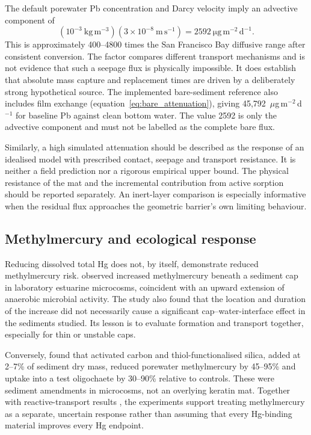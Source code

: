 The default porewater Pb concentration and Darcy velocity imply an advective component of
\begin{equation}
(10^{-3}\ \mathrm{kg\,m^{-3}})
(3\times10^{-8}\ \mathrm{m\,s^{-1}})
=2592\ \mathrm{\mu g\,m^{-2}\,d^{-1}}.
\end{equation}
This is approximately 400--4800 times the San Francisco Bay diffusive range after consistent conversion. The factor compares different transport mechanisms and is not evidence that such a seepage flux is physically impossible. It does establish that absolute mass capture and replacement times are driven by a deliberately strong hypothetical source. The implemented bare-sediment reference also includes film exchange (equation~\ref{eq:bare_attenuation}), giving 45,792~$\mu$g\,m$^{-2}$\,d$^{-1}$ for baseline Pb against clean bottom water. The value 2592 is only the advective component and must not be labelled as the complete bare flux.

Similarly, a high simulated attenuation should be described as the response of an idealised model with prescribed contact, seepage and transport resistance. It is neither a field prediction nor a rigorous empirical upper bound. The physical resistance of the mat and the incremental contribution from active sorption should be reported separately. An inert-layer comparison is especially informative when the residual flux approaches the geometric barrier's own limiting behaviour.

\subsection{Methylmercury and ecological response}

Reducing dissolved total Hg does not, by itself, demonstrate reduced methylmercury risk. \citet{johnson2010} observed increased methylmercury beneath a sediment cap in laboratory estuarine microcosms, coincident with an upward extension of anaerobic microbial activity. The study also found that the location and duration of the increase did not necessarily cause a significant cap--water-interface effect in the sediments studied. Its lesson is to evaluate formation and transport together, especially for thin or unstable caps.

Conversely, \citet{gilmour2013} found that activated carbon and thiol-functionalised silica, added at 2--7\% of sediment dry mass, reduced porewater methylmercury by 45--95\% and uptake into a test oligochaete by 30--90\% relative to controls. These were sediment amendments in microcosms, not an overlying keratin mat. Together with reactive-transport results \citep{bessinger2012}, the experiments support treating methylmercury as a separate, uncertain response rather than assuming that every Hg-binding material improves every Hg endpoint.

